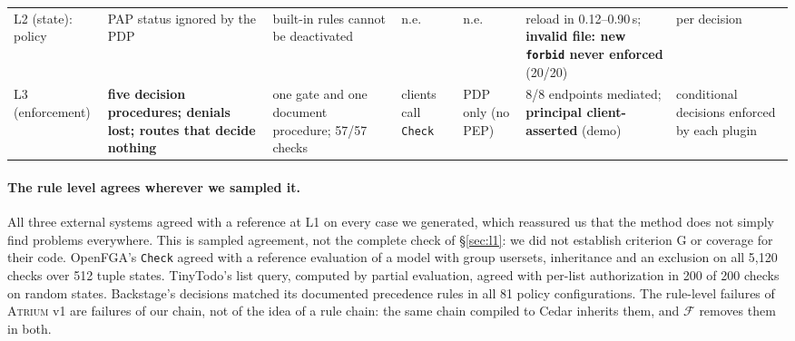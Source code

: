 \documentclass[sigconf,review,anonymous]{acmart}
\newcommand{\sysname}{\textsc{Atrium}\xspace}
\newcommand{\sysname}{\textsc{OpenZTAC}\xspace}
\begin{document}
\begin{table}[t]
\begin{tabularx}{\textwidth}{@{}l@{\;\;}X@{\;\;}X@{\;\;}X@{\;\;}X@{\;\;}X@{\;\;}X@{}}
L2 (state): policy & PAP status ignored by the PDP & built-in rules cannot be deactivated & n.e. & n.e. & reload in 0.12--0.90\,s; \textbf{invalid file: new \texttt{forbid} never enforced} (20/20) & per decision \\
L3 (enforcement) & \textbf{five decision procedures; denials lost; routes that decide nothing} & one gate and one document procedure; 57/57 checks & clients call \texttt{Check} & PDP only (no PEP) & 8/8 endpoints mediated; \textbf{principal client-asserted} (demo) & conditional decisions enforced by each plugin \\
\bottomrule
\end{tabularx}
\end{table}

\paragraph{The rule level agrees wherever we sampled it.} All three external systems agreed with a reference at L1 on
every case we generated, which reassured us that the method does not simply find problems everywhere. This is
sampled agreement, not the complete check of \S\ref{sec:l1}: we did not establish criterion G or coverage for
their code. OpenFGA's \texttt{Check} agreed with a reference
evaluation of a model with group usersets, inheritance and an exclusion on all 5{,}120 checks over 512 tuple
states. TinyTodo's list query, computed by partial evaluation, agreed with per-list authorization in 200 of 200
checks on random states. Backstage's decisions matched its documented precedence rules in all 81 policy
configurations. The rule-level failures of \sysname v1 are failures of our chain, not of the idea of a rule
chain: the same chain compiled to Cedar inherits them, and $\mathcal{F}$ removes them in both.
\end{document}
